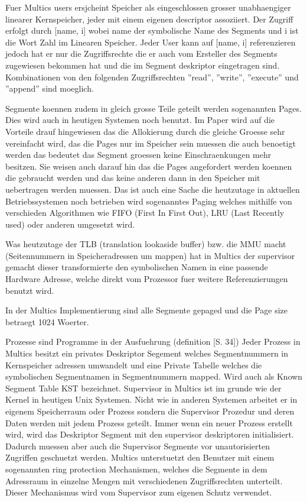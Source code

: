 \documentclass[9pt,technote]{IEEEtran}
\begin{document}
 Fuer Multics users ersjcheint Speicher als eingeschlossen grosser unabhaengiger linearer Kernspeicher, jeder mit einem eigenen descriptor assoziiert. 
 Der Zugriff erfolgt durch [name, i] wobei name der symbolische Name des Segments und i ist die Wort Zahl im Linearen Speicher.
 Jeder User kann auf [name, i] referenzieren jedoch hat er nur die Zugriffsrechte die er auch vom Ersteller des Segments zugewiesen bekommen hat
 und die im Segment deskriptor eingetragen sind. Kombinationen von den folgenden Zugriffsrechten ''read'', ''write'', ''execute'' und ''append'' sind moeglich.
 
 Segmente koennen zudem in gleich grosse Teile geteilt werden sogenannten Pages. Dies wird auch in heutigen Systemen noch benutzt.
 Im Paper \cite{inproc:multics} wird auf die Vorteile drauf hingewiesen das die Allokierung durch die gleiche Groesse sehr vereinfacht wird,
 das die Pages nur im Speicher sein muessen die auch benoetigt werden das bedeutet das Segment groessen keine Einschraenkungen mehr besitzen.
 Sie weisen auch darauf hin das die Pages angefordert werden koennen die gebraucht werden und das keine anderen dann in den Speicher mit uebertragen werden muessen.
 Das ist auch eine Sache die heutzutage in aktuellen Betriebssystemen noch betrieben wird sogenanntes Paging welches mithilfe von
 verschieden Algorithmen wie FIFO (First In First Out), LRU (Last Recently used) oder anderen umgesetzt wird.
 
 Was heutzutage der TLB (translation lookaside buffer) bzw. die MMU macht (Seitennummern in Speicheradressen um mappen) hat in Multics der supervisor gemacht
 dieser transformierte den symbolischen Namen in eine passende Hardware Adresse, welche direkt vom Prozessor fuer weitere Referenzierungen benutzt wird.
 
 In der Multics Implementierung sind alle Segmente gepaged und die Page size betraegt 1024 Woerter.
 
 Prozesse sind Programme in der Ausfuehrung (definition \cite{inproc:multics}[S. 34]) Jeder Prozess in Multics besitzt ein privates Deskriptor Segement welches
 Segmentnummern in Kernspeicher adressen umwandelt und eine Private Tabelle welches die symbolischen Segmentnamen in Segmentnummern mapped. Wird
 auch als Known Segment Table KST bezeichnet. Supervisor in Multics ist im grunde wie der Kernel in heutigen Unix Systemen.
 Nicht wie in anderen Systemen arbeitet er in eigenem Speicherraum oder Prozess sondern die Supervisor Prozedur und deren Daten werden mit jedem Prozess geteilt. 
 Immer wenn ein neuer Prozess erstellt wird, wird das Deskriptor Segment mit den supervisor deskriptoren initialisiert. Dadurch muessen aber auch die Supervisor
 Segmente vor unautorisierten Zugriffen geschuetzt werden. Multics unterstuetzt den Benutzer mit einem sogenannten ring protection Mechanismen,
 welches die Segmente in dem Adressraum in einzelne Mengen mit verschiedenen Zugriffsrechten unterteilt. Dieser Mechanismus wird vom Supervisor zum
 eigenen Schutz verwendet.
 
\end{document}
